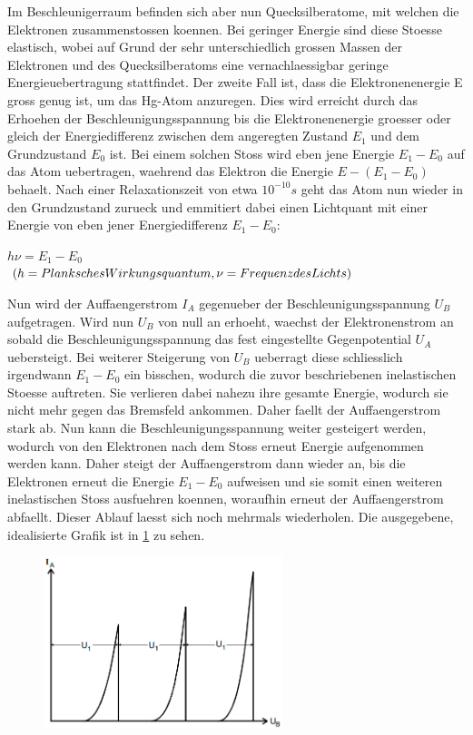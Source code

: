 Im Beschleunigerraum befinden sich aber nun Quecksilberatome, mit welchen die Elektronen zusammenstossen koennen. Bei geringer Energie sind diese Stoesse elastisch, wobei auf Grund der sehr unterschiedlich grossen Massen der Elektronen und des Quecksilberatoms eine vernachlaessigbar geringe Energieuebertragung stattfindet.
\newpage \noindent Der zweite Fall ist, dass die Elektronenenergie E gross genug ist, um das Hg-Atom anzuregen. Dies wird erreicht durch das Erhoehen der Beschleunigungsspannung bis die Elektronenenergie groesser oder gleich der Energiedifferenz zwischen dem angeregten Zustand $E_1$ und dem Grundzustand $E_0$ ist. Bei einem solchen Stoss wird eben jene Energie $E_1-E_0$ auf das Atom uebertragen, waehrend das Elektron die Energie $E-(E_1-E_0)$ behaelt. Nach einer Relaxationszeit von etwa $10^{-10}s$ geht das Atom nun wieder in den Grundzustand zurueck und emmitiert dabei einen Lichtquant mit einer Energie von eben jener Energiedifferenz $E_1-E_0$:
   \begin{center}
    $h\nu=E_1-E_0 \nonumber$\\
    $(h=Planksches \space Wirkungsquantum, \nu=Frequenz \space des \space Lichts)\nonumber$
   \end{center}
Nun wird der Auffaengerstrom $I_A$ gegenueber der Beschleunigungsspannung $U_B$ aufgetragen. Wird nun $U_B$ von null an erhoeht, waechst der Elektronenstrom an sobald die Beschleunigungsspannung das fest eingestellte Gegenpotential $U_A$ uebersteigt. Bei weiterer Steigerung von $U_B$ ueberragt diese schliesslich irgendwann $E_1-E_0$ ein bisschen, wodurch die zuvor beschriebenen inelastischen Stoesse auftreten. Sie verlieren dabei nahezu ihre gesamte Energie, wodurch sie nicht mehr gegen das Bremsfeld ankommen. Daher faellt der Auffaengerstrom stark ab. Nun kann die Beschleunigungsspannung weiter gesteigert werden, wodurch von den Elektronen nach dem Stoss erneut Energie aufgenommen werden kann. Daher steigt der Auffaengerstrom dann wieder an, bis die Elektronen erneut die Energie $E_1-E_0$ aufweisen und sie somit einen weiteren inelastischen Stoss ausfuehren koennen, woraufhin erneut der Auffaengerstrom abfaellt. Dieser Ablauf laesst sich noch mehrmals wiederholen. Die ausgegebene, idealisierte Grafik ist in \ref{Fig:Ideal} zu sehen.
\begin{figure}[H]
    \centering
    \captionsetup{justification=centering}
    \includegraphics[height=5cm]{"Ideal_FranckHertz.png"}
    \label{Fig:Ideal}
\end{figure}
